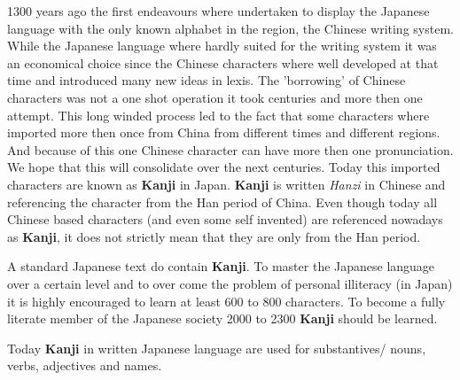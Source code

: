 

1300 years ago the first endeavours where undertaken to display the Japanese
language with the only known alphabet in the region, the Chinese writing
system. While the Japanese language where hardly suited for the writing system
it was an economical choice since the Chinese characters where well developed
at that time and introduced many new ideas in lexis. The 'borrowing' of Chinese
characters was not a one shot operation it took centuries and more then one
attempt. This long winded process led to the fact that some characters where
imported more then once from China from different times and different regions.
And because of this one Chinese character can have more then one pronunciation.
We hope that this will consolidate over the next centuries. Today this imported
characters are known as \textbf{Kanji} in Japan. \textbf{Kanji} is written
\textit{Hanzi} in Chinese and referencing the character from the Han period of
China. Even though today all Chinese based characters (and even some self
invented) are referenced nowadays as \textbf{Kanji}, it does not strictly mean
that they are only from the Han period.

A standard Japanese text do contain \textbf{Kanji}. To master the Japanese
language over a certain level and to over come the problem of personal
illiteracy (in Japan) it is highly encouraged to learn at least 600 to 800
characters. To become a fully literate member of the Japanese society 2000 to
2300 \textbf{Kanji} should be learned.

Today \textbf{Kanji} in written Japanese language are used for substantives/
nouns, verbs, adjectives and names.
